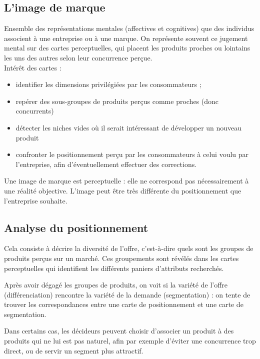		\subsection{L'image de marque}
		
		Ensemble des représentations mentales (affectives et cognitives) que des individus associent à une entreprise ou à une marque. On représente souvent ce jugement mental sur des cartes perceptuelles, qui placent les produits proches ou lointains les uns des autres selon leur concurrence perçue. \\
		
		Intérêt des cartes :
		
		\begin{itemize}
			\item identifier les dimensions privilégiées par les consommateurs ;
			\item repérer des sous-groupes de produits perçus comme proches (donc concurrents)
			\item détecter les niches vides où il serait intéressant de développer un nouveau produit
			\item confronter le positionnement perçu par les consommateurs à celui voulu par l'entreprise, afin d'éventuellement effectuer des corrections.
		\end{itemize}
		
		Une image de marque est perceptuelle : elle ne correspond pas nécessairement à une réalité objective. L'image peut être très différente du positionnement que l'entreprise souhaite.
		
		\subsection{Analyse du positionnement}
		
		Cela consiste à décrire la diversité de l'offre, c'est-à-dire quels sont les groupes de produits perçus sur un marché. Ces groupements sont révélés dans les cartes perceptuelles qui identifient les différents paniers d'attributs recherchés.
		
		Après avoir dégagé les groupes de produits, on voit si la variété de l'offre (différenciation) rencontre la variété de la demande (segmentation) : on tente de trouver les correspondances entre une carte de positionnement et une carte de segmentation. 
		
		Dans certains cas, les décideurs peuvent choisir d'associer un produit à des produits qui ne lui est pas naturel, afin par exemple d'éviter une concurrence trop direct, ou de servir un segment plus attractif.
		
